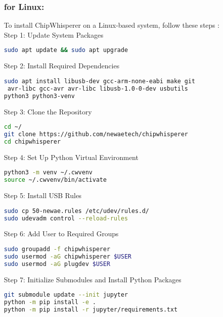 \subsubsection{for Linux:}

To install ChipWhisperer on a Linux-based system, follow these steps \cite{chipwhisperer_linux_install}:\\

Step 1: Update System Packages\\
\begin{lstlisting}[language=bash]
sudo apt update && sudo apt upgrade
\end{lstlisting}

Step 2: Install Required Dependencies\\
\begin{lstlisting}[language=bash]
sudo apt install libusb-dev gcc-arm-none-eabi make git
 avr-libc gcc-avr avr-libc libusb-1.0-0-dev usbutils
python3 python3-venv
\end{lstlisting}

Step 3: Clone the Repository\\
\begin{lstlisting}[language=bash]
cd ~/
git clone https://github.com/newaetech/chipwhisperer
cd chipwhisperer
\end{lstlisting}

Step 4: Set Up Python Virtual Environment\\
\begin{lstlisting}[language=bash]
python3 -m venv ~/.cwvenv
source ~/.cwvenv/bin/activate
\end{lstlisting}

Step 5: Install USB Rules\\
\begin{lstlisting}[language=bash]
sudo cp 50-newae.rules /etc/udev/rules.d/
sudo udevadm control --reload-rules
\end{lstlisting}

Step 6: Add User to Required Groups\\
\begin{lstlisting}[language=bash]
sudo groupadd -f chipwhisperer
sudo usermod -aG chipwhisperer $USER
sudo usermod -aG plugdev $USER
\end{lstlisting}

Step 7: Initialize Submodules and Install Python Packages\\
\begin{lstlisting}[language=bash]
git submodule update --init jupyter
python -m pip install -e .
python -m pip install -r jupyter/requirements.txt
\end{lstlisting}

